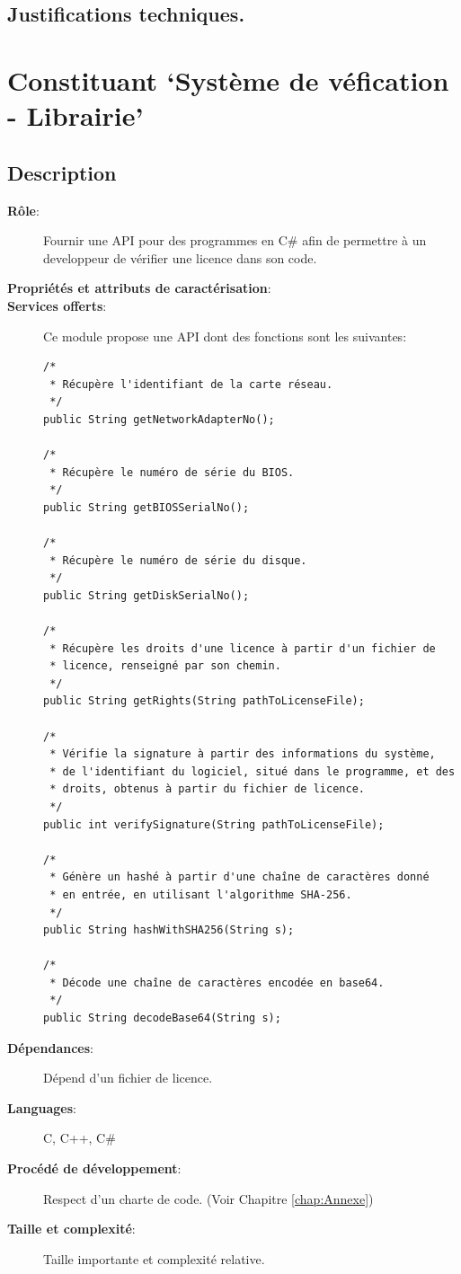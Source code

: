 \subsection{Justifications techniques.}

\section{Constituant `Système de véfication - Librairie'}
\subsection{Description}
\begin{description}
	\item[\textbf{Rôle}:]
		Fournir une API pour des programmes en C\# afin de 
		permettre à un developpeur de vérifier une licence dans son code.
	\item[\textbf{Propriétés et attributs de caractérisation}:]

	\newpage

	\item[\textbf{Services offerts}:]
		Ce module propose une API dont des fonctions sont les suivantes:
		\begin{verbatim}
/*
 * Récupère l'identifiant de la carte réseau.
 */
public String getNetworkAdapterNo();

/*
 * Récupère le numéro de série du BIOS.
 */
public String getBIOSSerialNo();

/*
 * Récupère le numéro de série du disque.
 */
public String getDiskSerialNo();

/*
 * Récupère les droits d'une licence à partir d'un fichier de
 * licence, renseigné par son chemin.
 */
public String getRights(String pathToLicenseFile);

/*
 * Vérifie la signature à partir des informations du système,
 * de l'identifiant du logiciel, situé dans le programme, et des
 * droits, obtenus à partir du fichier de licence.
 */
public int verifySignature(String pathToLicenseFile);

/*
 * Génère un hashé à partir d'une chaîne de caractères donné
 * en entrée, en utilisant l'algorithme SHA-256.
 */
public String hashWithSHA256(String s);

/*
 * Décode une chaîne de caractères encodée en base64.
 */
public String decodeBase64(String s);
			\end{verbatim}

	\item[\textbf{Dépendances}:]
		Dépend d'un fichier de licence.	
	\item[\textbf{Languages}:]
		C, C++, C\#
	\item[\textbf{Procédé de développement}:]
		Respect d'un charte de code. (Voir Chapitre \ref{chap:Annexe})
	\item[\textbf{Taille et complexité}:]
		Taille importante et complexité relative.
\end{description}

